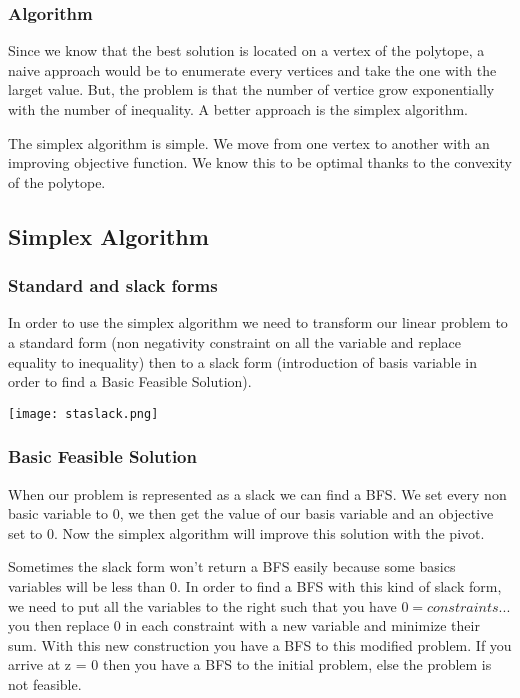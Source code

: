 \subsubsection{Algorithm}
Since we know that the best solution is located on a vertex of the polytope, a naive approach would be to enumerate every vertices and take the one with the larget value. But, the problem is that the number of vertice grow exponentially with the number of inequality. A better approach is the simplex algorithm. 

The simplex algorithm is simple. We move from one vertex to another with an improving objective function. We know this to be optimal thanks to the convexity of the polytope.

\subsection{Simplex Algorithm}

\subsubsection{Standard and slack forms}
In order to use the simplex algorithm we need to transform our linear problem to a standard form (non negativity constraint on all the variable and replace equality to inequality) then to a slack form (introduction of basis variable in order to find a Basic Feasible Solution).

\centerline{\texttt{[image: staslack.png]}}

\subsubsection{Basic Feasible Solution}
When our problem is represented as a slack we can find a BFS. We set every non basic variable to 0, we then get the value of our basis variable and an objective set to 0. Now the simplex algorithm will improve this solution with the pivot.

Sometimes the slack form won't return a BFS easily because some basics variables will be less than 0. In order to find a BFS with this kind of slack form, we need to put all the variables to the right such that you have $0 = constraints ...$ you then replace 0 in each constraint with a new variable and minimize their sum. With this new construction you have a BFS to this modified problem. If you arrive at z = 0 then you have a BFS to the initial problem, else the problem is not feasible.

